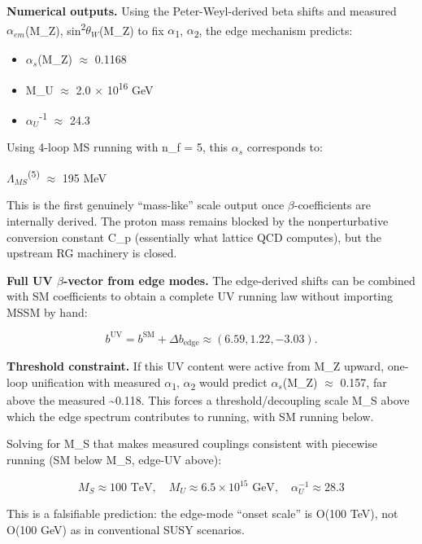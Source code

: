 \documentclass[11pt,a4paper]{article}
\theoremstyle{remark}
\providecommand{\tightlist}{%
  \setlength{\itemsep}{0pt}\setlength{\parskip}{0pt}}
\begin{document}
\textbf{Numerical outputs.} Using the Peter-Weyl-derived beta shifts and measured $\alpha_{em}$(M\_Z), sin\textsuperscript{2}$\theta_W$(M\_Z) to fix \ensuremath{\alpha}\textsubscript{1}, \ensuremath{\alpha}\textsubscript{2}, the edge mechanism predicts:

\begin{itemize}
\tightlist
\item
  $\alpha_s$(M\_Z) \ensuremath{\approx} 0.1168
\item
  M\_U \ensuremath{\approx} 2.0 \ensuremath{\times} 10\textsuperscript{16} GeV
\item
  $\alpha_U$\textsuperscript{-1} \ensuremath{\approx} 24.3
\end{itemize}

Using 4-loop MS running with n\_f = 5, this $\alpha_s$ corresponds to:

$\Lambda_{MS}$\textsuperscript{(5)} \ensuremath{\approx} 195 MeV

This is the first genuinely ``mass-like'' scale output once \ensuremath{\beta}-coefficients are
internally derived. The proton mass remains blocked by the nonperturbative
conversion constant C\_p (essentially what lattice QCD computes), but the
upstream RG machinery is closed.

\textbf{Full UV \ensuremath{\beta}-vector from edge modes.} The edge-derived shifts can be combined with SM coefficients to obtain a complete UV running law without importing MSSM by hand:

\[
b^\mathrm{UV} = b^\mathrm{SM} + \Delta b_\mathrm{edge} \approx (6.59, 1.22, -3.03).
\]

\textbf{Threshold constraint.} If this UV content were active from M\_Z upward, one-loop unification with measured \ensuremath{\alpha}\textsubscript{1}, \ensuremath{\alpha}\textsubscript{2} would predict $\alpha_s$(M\_Z) \ensuremath{\approx} 0.157, far above the measured \textasciitilde0.118. This forces a threshold/decoupling scale M\_S above which the edge spectrum contributes to running, with SM running below.

Solving for M\_S that makes measured couplings consistent with piecewise running (SM below M\_S, edge-UV above):

\[
M_S \approx 100 \text{ TeV}, \quad M_U \approx 6.5 \times 10^{15} \text{ GeV}, \quad \alpha_U^{-1} \approx 28.3
\]

This is a falsifiable prediction: the edge-mode ``onset scale'' is O(100 TeV), not O(100 GeV) as in conventional SUSY scenarios.
\end{document}
